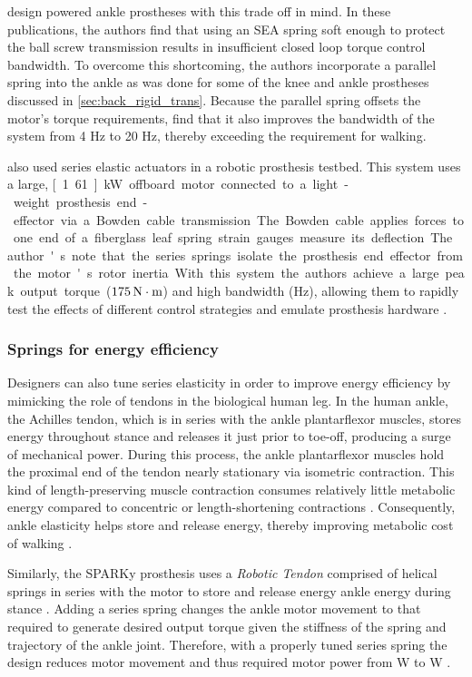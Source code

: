 \citet{au2007biomechanical, au2008powered} design powered ankle prostheses with
this trade off in mind. In these publications, the authors find that using an
SEA spring soft enough to protect the ball screw transmission results in
insufficient closed loop torque control bandwidth. To overcome this shortcoming,
the authors incorporate a parallel spring into the ankle as was done for some of
the knee and ankle prostheses discussed in \cref{sec:back_rigid_trans}. Because
the parallel spring offsets the motor's torque requirements,
\citeauthor{au2008powered} find that it also improves the bandwidth of the
system from 4 Hz to 20 Hz, thereby exceeding the requirement for walking. 

\citet{caputo2013experimental} also used series elastic actuators in a robotic
prosthesis testbed. This system uses a large, \unit[1.61]{kW} offboard motor
connected to a light-weight prosthesis end-effector via a Bowden cable
transmission. The Bowden cable applies forces to one end of a fiberglass leaf
spring strain gauges measure its deflection. The author's note that the series 
springs isolate the prosthesis end effector from the motor's rotor inertia. With
this system the authors achieve a large peak output torque ($\unit[175]{N \cdot
m}$) and high bandwidth (\unit[17]{Hz}), allowing them to rapidly test the
effects of different control strategies and emulate prosthesis hardware
\citep{caputo2015informing}.

\subsubsection{Springs for energy efficiency}
Designers can also tune series elasticity in order to improve energy efficiency
by mimicking the role of tendons in the biological human leg. In the human
ankle, the Achilles tendon, which is in series with the ankle plantarflexor
muscles, stores energy throughout stance and releases it just prior to toe-off,
producing a surge of mechanical power. During this process, the ankle
plantarflexor muscles hold the proximal end of the tendon nearly stationary via
isometric contraction. This kind of length-preserving muscle contraction
consumes relatively little metabolic energy compared to concentric or
length-shortening contractions \citep{rall1984energetic}. Consequently, ankle
elasticity helps store and release energy, thereby improving metabolic cost of
walking \citep{sawicki2009pays}.

Similarly, the SPARKy prosthesis uses a \emph{Robotic Tendon} comprised of
helical springs in series with the motor to store and release energy ankle
energy during stance \citep{hitt2007sparky, bellman2008sparky,
holgate2008sparky}. Adding a series spring changes the ankle motor movement to
that required to generate desired output torque given the stiffness of the
spring and trajectory of the ankle joint. Therefore, with a properly tuned series spring the
design reduces motor movement and thus required motor power from \unit[250]{W}
to \unit[77]{W} \citep{hitt2007sparky}.

